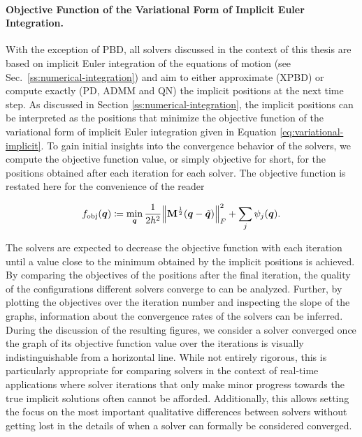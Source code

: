 \paragraph{Objective Function of the Variational Form of Implicit Euler Integration.}
With the exception of PBD, all solvers discussed in the context of this thesis are based on implicit Euler integration of the equations of 
motion (see Sec.\ \ref{ss:numerical-integration}) and aim to either approximate (XPBD) or compute exactly (PD, ADMM and QN) the implicit positions at the next time step. 
As discussed in Section \ref{ss:numerical-integration}, the implicit positions can be interpreted as the positions that minimize the objective function of the variational 
form of implicit Euler integration given in Equation \ref{eq:variational-implicit}. To gain initial insights into the convergence behavior of the solvers, we compute 
the objective function value, or simply objective for short, for the positions obtained after each iteration for each solver. The objective function is restated here 
for the convenience of the reader

\begin{equation}\label{eq:variational-implicit-copy}
    f_{\text{obj}}(\bm{q}) \coloneqq \min_{\bm{q}} \frac{1}{2h^2} \norm{\mathbf{M}^{\frac{1}{2}}(\bm{q} - \tilde{\bm{q}})}^2_F + \sum_j \psi_j(\bm{q}).
\end{equation}

\noindent The solvers are expected to decrease the objective function with each iteration until a value close to the minimum obtained 
by the implicit positions is achieved. By comparing the objectives of the positions after the final iteration, the quality of the configurations different
solvers converge to can be analyzed. Further, by plotting the objectives over the iteration number and inspecting the slope of the graphs, information about
the convergence rates of the solvers can be inferred. During the discussion of the resulting figures, we consider a solver converged once the graph of its objective function 
value over the iterations is visually indistinguishable from a horizontal line. While not entirely rigorous, this is particularly appropriate for comparing solvers in the 
context of real-time applications where solver iterations that only make minor progress towards the true implicit solutions often cannot be afforded. Additionally, this 
allows setting the focus on the most important qualitative differences between solvers without getting lost in the details of when a solver can formally be considered converged.

